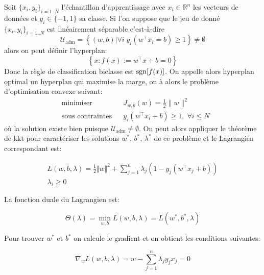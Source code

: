 Soit $\{ x_i , y_i \}_{i=1..N}$ l'échantillon d'apprentissage avec $x_i \in \mathbb{R}^n$ les vecteurs de données et $y_i \in \{-1,1\} $ sa classe. 
Si l'on suppose que le jeu de donné $ \{ x_i , y_i \}_{i=1..N} $ est linéairement séparable c'est-à-dire
\begin{equation*}
    \mathcal{U}_{\text{adm}} = \left\{ (w,b) | \forall i \; y_i ( w^\intercal x_i = b)\geq 1  \right\} \neq \emptyset
\end{equation*}
alors on peut définir l'hyperplan:
\begin{equation*}
    \left\{ x : f(x) := w^\intercal x + b = 0 \right\}
\end{equation*} 
Donc la règle de classification biclasse est $ \operatorname{sgn} [ f(x) ] $. On appelle alors hyperplan optimal un hyperplan qui maximise la marge, on à alors le problème d'optimisation convexe suivant:
\begin{equation*}
    \begin{aligned}
        & \text{minimiser}
        & & J_{w,b}(w) = \frac{1}{2} \| w \|^2 \\
        & \text{sous contraintes}
        & & y_i \left( w^\intercal x_i + b \right)\geq 1 , \; \forall i \leq N
    \end{aligned}
\end{equation*}
où la solution existe bien puisque $\mathcal{U}_{\text{adm}} \neq \emptyset$. On peut alors appliquer le théorème de \ac{kkt} pour caractériser les solutions $w^*$, $b^*$, $\lambda^*$ de ce problème et le Lagrangien correspondant est:

\begin{gather*}
    L (w,b,\lambda) = \frac{1}{2} \Vert w \Vert^2 + \sum_{j=1}^n \lambda_j ( 1 - y_j ( w^\intercal x_j + b )) \\
    \lambda_i\geq 0
\end{gather*}

La fonction duale du Lagrangien est:

\begin{equation*}
    \Theta (\lambda) = \min_{w,b} L (w,b,\lambda) = L (w^*,b^*,\lambda)
\end{equation*}

Pour trouver $w^*$ et $b^*$ on calcule le gradient et on obtient les conditions suivantes:

\begin{equation*}
    \nabla_w L (w,b,\lambda) = w - \sum_{j=1}^n \lambda_j y_j x_j = 0
\end{equation*}

